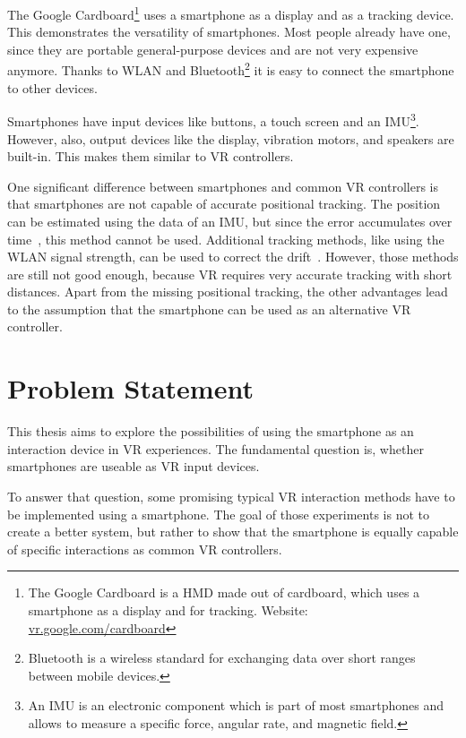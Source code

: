 The Google Cardboard\footnote{The Google Cardboard is a \gls{HMD} made out of cardboard, which uses a smartphone as a display and for tracking. Website: \href{https://vr.google.com/cardboard/}{vr.google.com/cardboard}} uses a smartphone as a display and as a tracking device. This demonstrates the versatility of smartphones. Most people already have one, since they are portable general-purpose devices and are not very expensive anymore. Thanks to \gls{WLAN} and Bluetooth\footnote{Bluetooth is a wireless standard for exchanging data over short ranges between mobile devices.} it is easy to connect the smartphone to other devices.

Smartphones have input devices like buttons, a touch screen and an \gls{IMU}\footnote{An IMU is an electronic component which is part of most smartphones and allows to measure a specific force, angular rate, and magnetic field.}. However, also, output devices like the display, vibration motors, and speakers are built-in. This makes them similar to \gls{VR} controllers.

One significant difference between smartphones and common \gls{VR} controllers is that smartphones are not capable of accurate positional tracking. The position can be estimated using the data of an \gls{IMU}, but since the error accumulates over time~\cite[44]{Steed.2013}, this method cannot be used. Additional tracking methods, like using the \gls{WLAN} signal strength, can be used to correct the drift~\cite{Zhang.2015}. However, those methods are still not good enough, because \gls{VR} requires very accurate tracking with short distances.
Apart from the missing positional tracking, the other advantages lead to the assumption that the smartphone can be used as an alternative \gls{VR} controller.


\section{Problem Statement}\label{section:problem-statement}
This thesis aims to explore the possibilities of using the smartphone as an interaction device in \gls{VR} experiences. The fundamental question is, whether smartphones are useable as \gls{VR} input devices.

To answer that question, some promising typical \gls{VR} interaction methods have to be implemented using a smartphone. The goal of those experiments is not to create a better system, but rather to show that the smartphone is equally capable of specific interactions as common \gls{VR} controllers.

